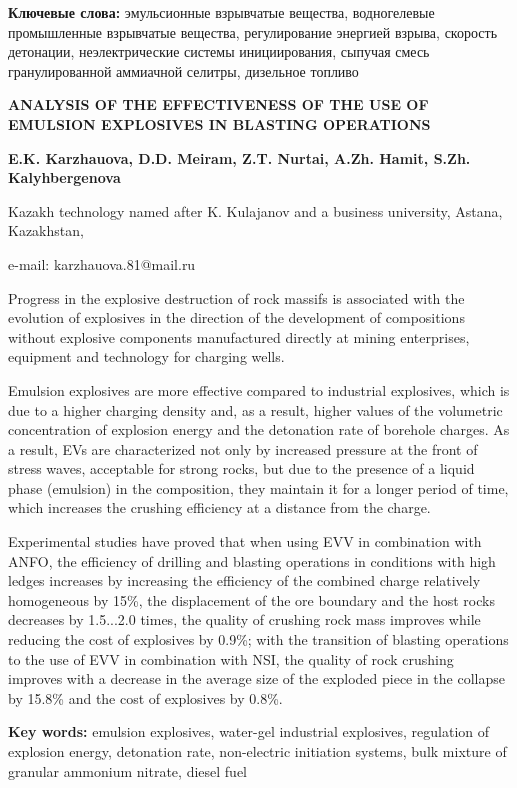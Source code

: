{\bfseries Ключевые слова:} эмульсионные взрывчатые вещества, водногелевые
промышленные взрывчатые вещества, регулирование энергией взрыва,
скорость детонации, неэлектрические системы инициирования, сыпучая смесь
гранулированной аммиачной селитры, дизельное топливо

{\bfseries ANALYSIS OF THE EFFECTIVENESS OF THE USE OF EMULSION EXPLOSIVES
IN BLASTING OPERATIONS}

{\bfseries E.K. Karzhauova, D.D. Meiram, Z.T. Nurtai, A.Zh. Hamit, S.Zh.
Kalyhbergenova}

Kazakh technology named after K. Kulajanov and a business university,
Astana, Kazakhstan,

e-mail: karzhauova.81@mail.ru

Progress in the explosive destruction of rock massifs is associated with
the evolution of explosives in the direction of the development of
compositions without explosive components manufactured directly at
mining enterprises, equipment and technology for charging wells.

Emulsion explosives are more effective compared to industrial
explosives, which is due to a higher charging density and, as a result,
higher values of the volumetric concentration of explosion energy and
the detonation rate of borehole charges. As a result, EVs are
characterized not only by increased pressure at the front of stress
waves, acceptable for strong rocks, but due to the presence of a liquid
phase (emulsion) in the composition, they maintain it for a longer
period of time, which increases the crushing efficiency at a distance
from the charge.

Experimental studies have proved that when using EVV in combination with
ANFO, the efficiency of drilling and blasting operations in conditions
with high ledges increases by increasing the efficiency of the combined
charge relatively homogeneous by 15\%, the displacement of the ore
boundary and the host rocks decreases by 1.5...2.0 times, the quality of
crushing rock mass improves while reducing the cost of explosives by
0.9\%; with the transition of blasting operations to the use of EVV in
combination with NSI, the quality of rock crushing improves with a
decrease in the average size of the exploded piece in the collapse by
15.8\% and the cost of explosives by 0.8\%.

{\bfseries Key words:} emulsion explosives, water-gel industrial
explosives, regulation of explosion energy, detonation rate,
non-electric initiation systems, bulk mixture of granular ammonium
nitrate, diesel fuel

